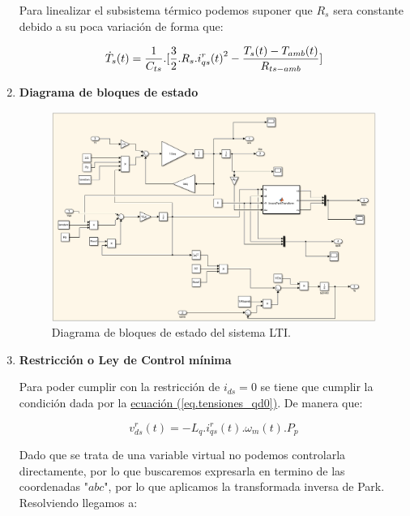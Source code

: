 \documentclass{article}
\begin{document}
\begin{enumerate}[label=\roman*.]
    Para linealizar el subsistema térmico podemos suponer que $R_s$ sera constante debido a su poca variación
    de forma que:

    \begin{equation}
        \dot{T}_{s}(t) = \frac{1}{C_{ts}}.[\frac{3}{2}.R_{s}.{i_{qs}^r(t)}^2 - \frac{T_{s}(t)-T_{amb}(t)}{R_{ts-amb}}]\\
    \end{equation}
        
    \item \textbf{Diagrama de bloques de estado}
    
    \begin{figure}[H]
        \centering
        \includegraphics[width=1\textwidth]{LTI.png}
        \caption{Diagrama de bloques de estado del sistema LTI.}
    \end{figure}
    
    \item \textbf{Restricción o Ley de Control mínima}

    Para poder cumplir con la restricción de $i_{ds} = 0$ se tiene que cumplir la condición dada por la
    \hyperref[eq.tensiones_qd0]{ecuación (\ref*{eq.tensiones_qd0})}. De manera que:

    \begin{equation}
        v_{ds}^r(t) = -L_{q}.i_{qs}^r(t).\omega_{m}(t).P_{p}
    \end{equation}

    Dado que se trata de una variable virtual no podemos controlarla directamente, por lo que buscaremos
    expresarla en termino de las coordenadas "$abc$", por lo que aplicamos la transformada inversa de Park.
    Resolviendo llegamos a:


\end{enumerate}
\end{document}
